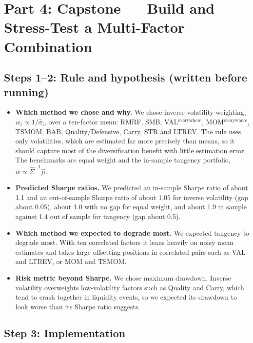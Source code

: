 \documentclass[11pt]{article}
\begin{document}
\section*{Part 4: Capstone --- Build and Stress-Test a Multi-Factor Combination}

\subsection*{Steps 1--2: Rule and hypothesis (written before running)}

\begin{itemize}
\item \textbf{Which method we chose and why.} We chose inverse-volatility weighting,
$w_i\propto 1/\hat\sigma_i$, over a ten-factor menu: RMRF, SMB, VAL$^{\text{everywhere}}$,
MOM$^{\text{everywhere}}$, TSMOM, BAB, Quality/Defensive, Carry, STR and LTREV. The rule uses
only volatilities, which are estimated far more precisely than means, so it should capture
most of the diversification benefit with little estimation error. The benchmarks are equal
weight and the in-sample tangency portfolio, $w\propto\hat\Sigma^{-1}\hat\mu$.

\item \textbf{Predicted Sharpe ratios.} We predicted an in-sample Sharpe ratio of about 1.1
and an out-of-sample Sharpe ratio of about 1.05 for inverse volatility (gap about 0.05),
about 1.0 with no gap for equal weight, and about 1.9 in sample against 1.4 out of sample
for tangency (gap about 0.5).

\item \textbf{Which method we expected to degrade most.} We expected tangency to degrade
most. With ten correlated factors it leans heavily on noisy mean estimates and takes large
offsetting positions in correlated pairs such as VAL and LTREV, or MOM and TSMOM.

\item \textbf{Risk metric beyond Sharpe.} We chose maximum drawdown. Inverse volatility
overweights low-volatility factors such as Quality and Carry, which tend to crash together
in liquidity events, so we expected its drawdown to look worse than its Sharpe ratio
suggests.
\end{itemize}

\subsection*{Step 3: Implementation}
\end{document}
